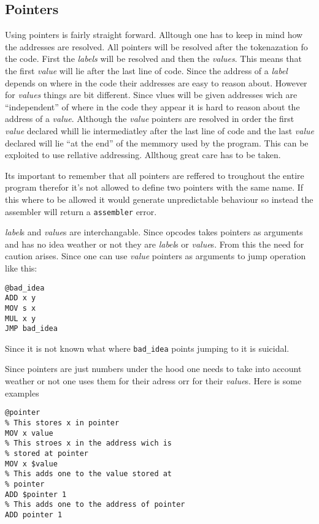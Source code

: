 \documentclass{article}
\newcommand{\V}{\verb}
\begin{document}
\subsection{Pointers}
Using pointers is fairly straight forward. Alltough one has to keep in mind how
the addresses are resolved. All pointers will be resolved after the
tokenazation fo the code. First the \emph{labels} will be resolved and then the
\emph{values}.
This means that the first \emph{value} will lie after the last line of code. Since the
address of a \emph{label} depends on where in the code their addresses are easy to
reason about. However for \emph{values} things are bit different. Since vlues
will be given addresses wich are ``independent'' of where in the code they appear it is
hard to reason about the address of a \emph{value}. Although the \emph{value} pointers are
resolved in order the first \emph{value} declared whill lie intermediatley after the
last line of code and the last \emph{value} declared will lie ``at the end'' of the
memmory used by the program. This can be exploited to use rellative addressing.
Allthoug great care has to be taken.

Its important to remember that all pointers are reffered to troughout the entire
program therefor it's not allowed to define two pointers with the same name. If
this where to be allowed it would generate unpredictable behaviour so instead
the assembler will return a \V+assembler+ error.

\emph{label}s and \emph{value}s are interchangable. Since opcodes takes pointers as arguments
and has no idea weather or not they are \emph{label}s or \emph{value}s. From this the need for
caution arises. Since one can use \emph{value} pointers as arguments to jump operation
like this:
\begin{verbatim}
@bad_idea
ADD x y
MOV s x
MUL x y
JMP bad_idea
\end{verbatim}
Since it is not known what where \V+bad_idea+ points jumping to it is suicidal.

Since pointers are just numbers under the hood one needs to take into account
weather or not one uses them for their adress orr for their \emph{value}s. Here is some
examples
\begin{verbatim}
@pointer
% This stores x in pointer
MOV x value
% This stroes x in the address wich is
% stored at pointer
MOV x $value
% This adds one to the value stored at 
% pointer
ADD $pointer 1
% This adds one to the address of pointer
ADD pointer 1
\end{verbatim}
\end{document}
